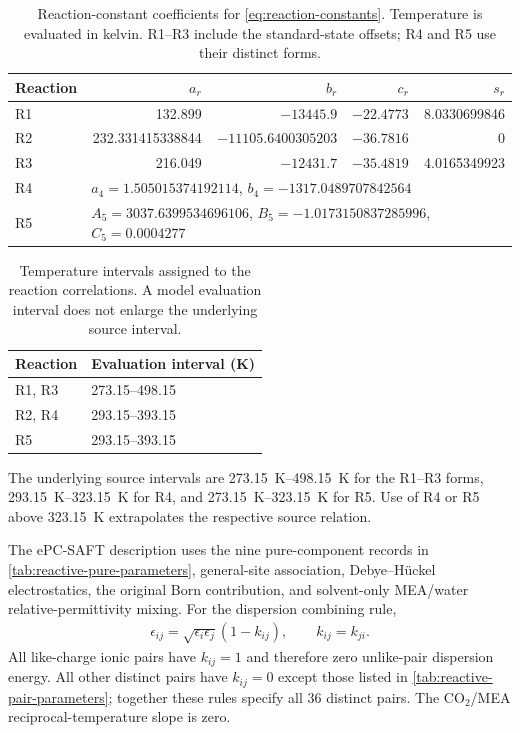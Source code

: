 \begin{table}[pos=htbp]
\centering
\caption{Reaction-constant coefficients for \cref{eq:reaction-constants}. Temperature is evaluated in kelvin. R1--R3 include the standard-state offsets; R4 and R5 use their distinct forms.}
\label{tab:reactive-constants}
\small
\begin{tabular}{@{}lrrrr@{}}
\toprule
Reaction & $a_r$ & $b_r$ & $c_r$ & $s_r$ \\
\midrule
R1 & 132.899 & $-13445.9$ & $-22.4773$ & 8.0330699846 \\
R2 & 232.331415338844 & $-11105.6400305203$ & $-36.7816$ & 0 \\
R3 & 216.049 & $-12431.7$ & $-35.4819$ & 4.0165349923 \\
\midrule
R4 & \multicolumn{4}{l}{$a_4=1.505015374192114$, $b_4=-1317.0489707842564$} \\
R5 & \multicolumn{4}{l}{$A_5=3037.6399534696106$, $B_5=-1.0173150837285996$, $C_5=0.0004277$} \\
\bottomrule
\end{tabular}
\end{table}

\begin{table}[pos=htbp]
\centering\small
\caption{Temperature intervals assigned to the reaction correlations. A model evaluation interval does not enlarge the underlying source interval.}
\label{tab:reaction-temperature-intervals}
\begin{tabular}{@{}ll@{}}
\toprule
Reaction & Evaluation interval (K)\\
\midrule
R1, R3 & 273.15--498.15\\
R2, R4 & 293.15--393.15\\
R5 & 293.15--393.15\\
\bottomrule
\end{tabular}
\end{table}

The underlying source intervals are \qtyrange{273.15}{498.15}{K} for the R1--R3 forms, \qtyrange{293.15}{323.15}{K} for R4, and \qtyrange{273.15}{323.15}{K} for R5.
Use of R4 or R5 above \qty{323.15}{K} extrapolates the respective source relation.

The ePC-SAFT description uses the nine pure-component records in \cref{tab:reactive-pure-parameters}, general-site association, Debye--H\"uckel electrostatics, the original Born contribution, and solvent-only MEA/water relative-permittivity mixing.
For the dispersion combining rule,
\begin{align}
\epsilon_{ij}=\sqrt{\epsilon_i\epsilon_j}(1-k_{ij}),\qquad k_{ij}=k_{ji}.
\end{align}
All like-charge ionic pairs have $k_{ij}=1$ and therefore zero unlike-pair dispersion energy.
All other distinct pairs have $k_{ij}=0$ except those listed in \cref{tab:reactive-pair-parameters}; together these rules specify all 36 distinct pairs.
The CO$_2$/MEA reciprocal-temperature slope is zero.


